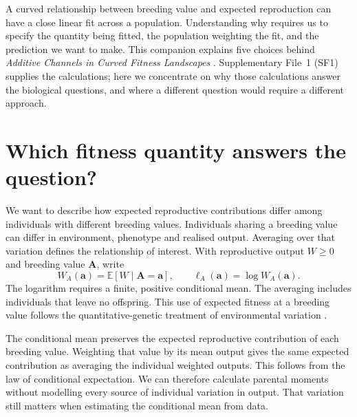 
A curved relationship between breeding value and expected reproduction can
have a close linear fit across a population. Understanding why requires us
to specify the quantity being fitted, the population weighting the fit, and
the prediction we want to make. This companion explains five choices behind
\emph{Additive Channels in Curved Fitness Landscapes}
\citep{OrtizBarrientosCooper2026}. Supplementary File~1 (SF1) supplies the
calculations; here we concentrate on why those calculations answer the
biological questions, and where a different question would require a
different approach.

\section{Which fitness quantity answers the question?}
\label{companion:target}

We want to describe how expected reproductive contributions differ among
individuals with different breeding values. Individuals sharing a breeding
value can differ in environment, phenotype and realised output. Averaging
over that variation defines the relationship of interest. With reproductive
output $W\geq0$ and breeding value $\mathbf A$, write
\begin{equation}
 W_A(\mathbf a)=\mathbb E[W\mid\mathbf A=\mathbf a],
 \qquad
 \ell_A(\mathbf a)=\log W_A(\mathbf a).
 \label{companion:eq:target}
\end{equation}
The logarithm requires a finite, positive conditional mean. The averaging includes
individuals that leave no offspring. This use of expected fitness at a
breeding value follows the quantitative-genetic treatment of environmental
variation \citep{Lande1979}.

The conditional mean preserves the expected reproductive contribution of
each breeding value. Weighting that value by its mean output gives the
same expected contribution as averaging the individual weighted outputs.
This follows from the law of conditional expectation. We can therefore
calculate parental moments without modelling every source of individual
variation in output. That variation still matters when estimating the
conditional mean from data.

